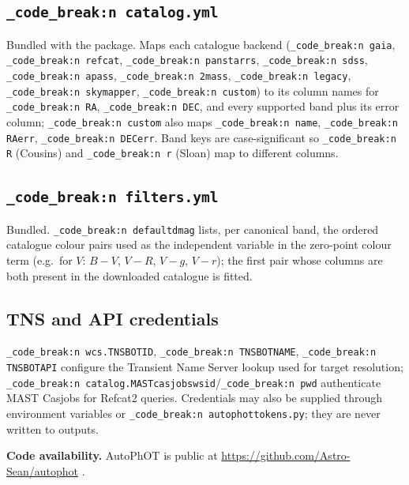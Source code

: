\documentclass[11pt,a4paper]{article}
\renewcommand{\_}{\autophotunderscore\allowbreak}
\DeclareRobustCommand{\code}[1]{\texttt{\autophot_code_break:n {#1}}}
\newcommand{\eg}{e.g.\ }
\begin{document}
\subsection{\texorpdfstring{\code{catalog.yml}}{catalog.yml}}

Bundled with the package. Maps each catalogue backend
(\code{gaia}, \code{refcat}, \code{pan\_starrs}, \code{sdss},
\code{apass}, \code{2mass}, \code{legacy}, \code{skymapper},
\code{custom}) to its column names for \code{RA}, \code{DEC}, and every
supported band plus its error column; \code{custom} also maps
\code{name}, \code{RA\_err}, \code{DEC\_err}. Band keys are
case-significant so \code{R} (Cousins) and \code{r} (Sloan) map to
different columns.

\subsection{\texorpdfstring{\code{filters.yml}}{filters.yml}}

Bundled. \code{default\_dmag} lists, per canonical band, the ordered
catalogue colour pairs used as the independent variable in the
zero-point colour term (\eg for $V$: $B-V$, $V-R$, $V-g$, $V-r$); the
first pair whose columns are both present in the downloaded catalogue is
fitted.

\subsection{TNS and API credentials}

\code{wcs.TNS\_BOT\_ID}, \code{TNS\_BOT\_NAME}, \code{TNS\_BOT\_API}
configure the Transient Name Server \citep{tns} lookup used for target
resolution; \code{catalog.MASTcasjobs\_wsid}\slash\code{pwd} authenticate
MAST Casjobs for Refcat2 queries. Credentials may also be supplied
through environment variables or \code{autophot\_tokens.py}; they are
never written to outputs.

\vspace{1em}
\noindent\textbf{Code availability.} AutoPhOT is public at
\url{https://github.com/Astro-Sean/autophot} \citep{brennan2022autophot}.


\end{document}
